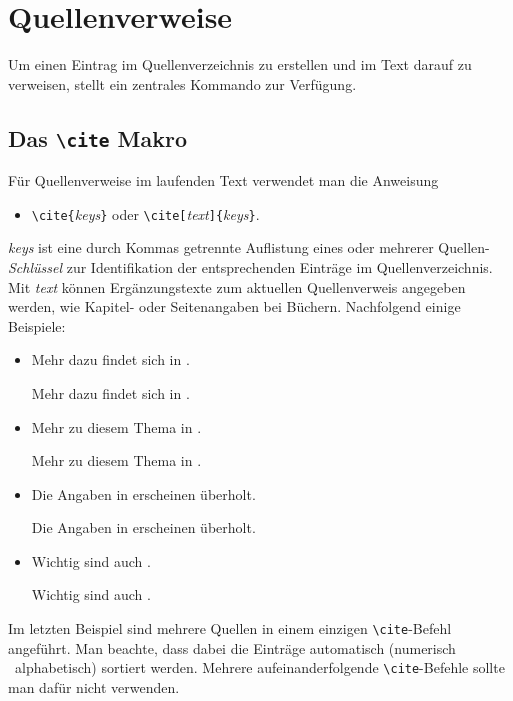 \section{Quellenverweise}

Um einen Eintrag im Quellenverzeichnis zu erstellen und im Text darauf zu
verweisen, stellt \latex ein zentrales Kommando zur Verfügung.

\subsection{Das \texttt{\textbackslash cite} Makro}

Für Quellenverweise im laufenden Text verwendet man die Anweisung
%
\begin{itemize}
\item[] \verb!\cite{!\textit{keys}\verb!}!
				\quad oder \quad
        \verb!\cite[!\textit{text}\verb!]{!\textit{keys}\verb!}!.
\end{itemize}

\noindent%
\textit{keys} ist eine durch Kommas getrennte Auflistung eines oder mehrerer
Quellen-\emph{Schlüssel} zur Identifikation der entsprechenden Einträge im
Quellenverzeichnis. Mit \textit{text} können Ergänzungstexte zum aktuellen
Quellenverweis angegeben werden, wie \zB Kapitel- oder Seitenangaben bei
Büchern. Nachfolgend einige Beispiele:
%
\begin{itemize}
    \item Mehr dazu findet sich in \cite{Kopka2003}.
\begin{LaTeXCode}[numbers=none]
Mehr dazu findet sich in \cite{Kopka2003}.
\end{LaTeXCode}
%
    \item Mehr zu diesem Thema in \cite[Kap.~3]{Kopka2003}.
\begin{LaTeXCode}[numbers=none]
Mehr zu diesem Thema in \cite[Kap.~3]{Kopka2003}.
\end{LaTeXCode}
%
    \item Die Angaben in \cite[S.\ 274--277]{BurgeBurger1999} erscheinen überholt.
\begin{LaTeXCode}[numbers=none]
Die Angaben in \cite[S.\ 274--277]{BurgeBurger1999} erscheinen überholt.
\end{LaTeXCode}
%
    \item Wichtig sind auch \cite{Patashnik1988,Feder2006,Duden1997}.
\begin{LaTeXCode}[numbers=none]
Wichtig sind auch \cite{Patashnik1988,Feder2006,Duden1997}.
\end{LaTeXCode}
\end{itemize}
%
Im letzten Beispiel sind mehrere Quellen in einem einzigen
\texttt{\textbackslash cite}-Befehl angeführt. Man beachte, dass dabei die
Einträge automatisch (numerisch \bzw\ alphabetisch) sortiert werden. Mehrere
aufeinanderfolgende \texttt{\textbackslash cite}-Befehle sollte man dafür
nicht verwenden.

